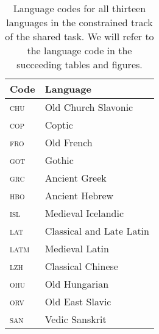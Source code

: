 \documentclass{../acl_latex.tex}
\begin{document}
\begin{table}[t]
    \centering
    \begin{tabular}{ll}
        \toprule
        Code          & Language                 \\ \midrule
        \textsc{chu}  & Old Church Slavonic      \\
        \textsc{cop}  & Coptic                   \\
        \textsc{fro}  & Old French               \\
        \textsc{got}  & Gothic                   \\
        \textsc{grc}  & Ancient Greek            \\
        \textsc{hbo}  & Ancient Hebrew           \\
        \textsc{isl}  & Medieval Icelandic       \\
        \textsc{lat}  & Classical and Late Latin \\
        \textsc{latm} & Medieval Latin           \\
        \textsc{lzh}  & Classical Chinese        \\
        \textsc{ohu}  & Old Hungarian            \\
        \textsc{orv}  & Old East Slavic          \\
        \textsc{san}  & Vedic Sanskrit           \\ \bottomrule
    \end{tabular}
    \caption{
        Language codes for all thirteen languages in the constrained track of the shared task.
        We will refer to the language code in the succeeding tables and figures.
    }
    \label{table:lang_to_code}
\end{table}
\end{document}
